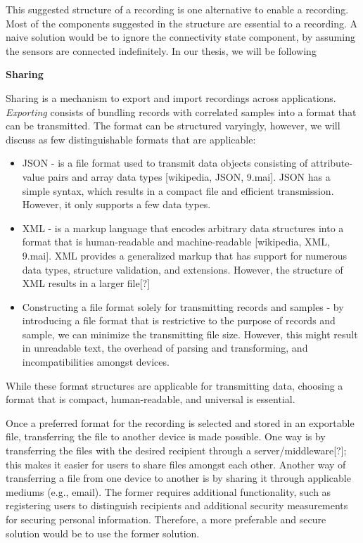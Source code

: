 This suggested structure of a recording is one alternative to enable a recording. Most of the components suggested in the structure are essential to a recording. A naive solution would be to ignore the connectivity state component, by assuming the sensors are connected indefinitely. In our thesis, we will be following 

\noindent \textbf{Sharing}

\noindent Sharing is a mechanism to export and import recordings across applications. \textit{Exporting} consists of bundling records with correlated samples into a format that can be transmitted. The format can be structured varyingly, however, we will discuss as few distinguishable formats that are applicable:

\begin{itemize}
    \item JSON - is a file format used to transmit data objects consisting of attribute-value pairs and array data types [wikipedia, JSON, 9.mai]. JSON has a simple syntax, which results in a compact file and efficient transmission. However, it only supports a few data types.
    \item XML - is a markup language that encodes arbitrary data structures into a format that is human-readable and machine-readable [wikipedia, XML, 9.mai]. XML provides a generalized markup that has support for numerous data types, structure validation, and extensions. However, the structure of XML results in a larger file[?]
    \item Constructing a file format solely for transmitting records and samples - by introducing a file format that is restrictive to the purpose of records and sample, we can minimize the transmitting file size. However, this might result in unreadable text, the overhead of parsing and transforming, and incompatibilities amongst devices. 
\end{itemize}
While these format structures are applicable for transmitting data, choosing a format that is compact, human-readable, and universal is essential. 

Once a preferred format for the recording is selected and stored in an exportable file, transferring the file to another device is made possible. One way is by transferring the files with the desired recipient through a server/middleware[?]; this makes it easier for users to share files amongst each other. Another way of transferring a file from one device to another is by sharing it through applicable mediums (e.g., email). The former requires additional functionality, such as registering users to distinguish recipients and additional security measurements for securing personal information. Therefore, a more preferable and secure solution would be to use the former solution. 

